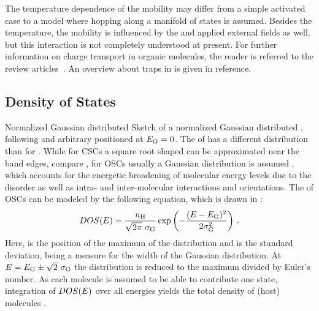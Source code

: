 The temperature dependence of the mobility may differ from a simple activated case to a model where hopping along a manifold of states is assumed\cite{Bassler1982, Vissenberg1998}. Besides the temperature, the mobility is influenced by the \nLong and applied external fields as well, but this interaction is not completely understood at present. For further information on charge transport in organic molecules, the reader is referred to the review articles~\cite{Tessler2009,Troisi2011}. An overview about traps in \OSCs is given in reference\cite{Schmechel2004}.

\subsection{Density of States}\label{sec:TheoOrgDOS}
%
%
{Normalized Gaussian distributed \dosLong}%
{Sketch of a normalized Gaussian distributed \dosLong, following  and arbitrary positioned at \mbox{$E_\text{G}=0$}.}%
%
The \dosLong of \OSCs has a different distribution than for \CSCs. While for CSCs a square root shaped \dos can be approximated near the band edges, compare , for OSCs usually a Gaussian distribution is assumed \cite{Schmechel2003, Tietze2012}, which accounts for the energetic broadening of molecular energy levels due to the disorder as well as intra- and inter-molecular interactions and orientations.
The \dos of OSCs can be modeled by the following equation, which is drawn in :
\begin{equation} \label{eq:DefGaussianDOS}
\dos(E) = \frac{\nH}{\sqrt{2 \pi} ~ \gausswidth} \exp{-\frac{(E-\gausscenter)^2}{2\gausswidth^2}}
\PUNKT
\end{equation}
Here, \gausscenter is the position of the maximum of the distribution and \gausswidth is the standard deviation, being a measure for the width of the Gaussian distribution. At \mbox{$E=\gausscenter\pm\sqrt{2}~\gausswidth$} the distribution is reduced to the maximum divided by Euler's number. As each molecule is assumed to be able to contribute one state, integration of $DOS(E)$ over all energies yields the total density of (host) molecules \nH.

